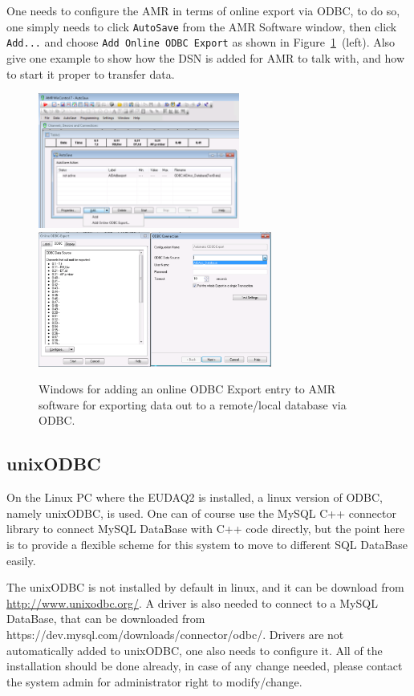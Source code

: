 \documentclass[a4paper,12pt]{scrartcl}
\begin{document}
One needs to configure the AMR in terms of online export via ODBC, to do so, one simply needs to click \texttt{AutoSave} from the AMR Software window, then click \texttt{Add...} and choose \texttt{Add Online ODBC Export} as shown in Figure~\ref{fig:amr-conf1}~(left).
Also give one example to show how the DSN is added for AMR to talk with, and how to start it proper to transfer data.

\begin{figure}[!ht]
\centering
\includegraphics[height=12em]{figs/AMR_AutoSave.png}%
\includegraphics[height=12em]{figs/AMR_odbc.png}
\caption{Windows for adding an online ODBC Export entry to AMR software for exporting data out to a remote/local database via ODBC.}
\label{fig:amr-conf1}
\end{figure}

\subsection{unixODBC}
On the Linux PC where the EUDAQ2 is installed, a linux version of ODBC, namely unixODBC, is used. One can of course use the MySQL C++ connector library to connect MySQL DataBase with C++ code directly, but the point here is to provide a flexible scheme for this system to move to different SQL DataBase easily.

The unixODBC is not installed by default in linux, and it can be download from \href{http://www.unixodbc.org/}{http://www.unixodbc.org/}. A driver is also needed to connect to a MySQL DataBase, that can be downloaded from https://dev.mysql.com/downloads/connector/odbc/. Drivers are not automatically added to unixODBC, one also needs to configure it. All of the installation should be done already, in case of any change needed, please contact the system admin for administrator right to modify/change.
\end{document}
